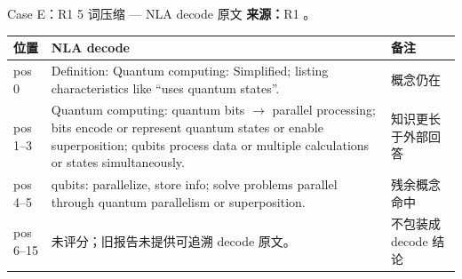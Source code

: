 \begin{frame}{Case E：R1 5 词压缩 — NLA decode 原文}
\scriptsize
\textbf{来源：}R1 。

\begin{tabularx}{\linewidth}{l>{\raggedright\arraybackslash}X>{\raggedright\arraybackslash}p{2.2cm}}
\toprule
位置 & NLA decode & 备注 \\
\midrule
pos 0 & Definition: Quantum computing: Simplified; listing characteristics like ``uses quantum states''. & 概念仍在 \\
pos 1--3 & Quantum computing: quantum bits \(\rightarrow\) parallel processing; bits encode or represent quantum states or enable superposition; qubits process data or multiple calculations or states simultaneously. & 知识更长于外部回答 \\
pos 4--5 & qubits: parallelize, store info; solve problems parallel through quantum parallelism or superposition. & 残余概念命中 \\
pos 6--15 & 未评分；旧报告未提供可追溯 decode 原文。 & 不包装成 decode 结论 \\
\bottomrule
\end{tabularx}
\end{frame}
